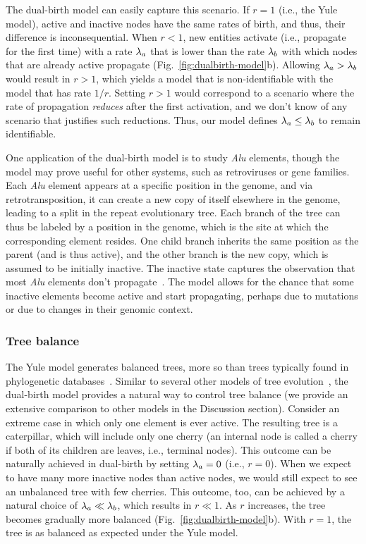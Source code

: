 The dual-birth model can easily capture this scenario. If $r=1$ (i.e., the Yule model), active and inactive nodes have the same rates of birth, and thus, their difference is inconsequential. When $r<1$, new entities activate (i.e., propagate for the first time) with a rate $\lambda_a$ that is lower than the rate $\lambda_b$ with which nodes that are already active propagate (Fig.~\ref{fig:dualbirth-model}b). Allowing $\lambda_a > \lambda_b$ would result in $r > 1$, which yields a model that is non-identifiable with the model that has rate $1/r$. Setting $r>1$ would correspond to a scenario where the rate of propagation \textit{reduces} after the first activation, and we don't know of any scenario that justifies such reductions. Thus, our model defines $\lambda_a\leq\lambda_b$ to remain identifiable.

One application of the dual-birth model is to study \textit{Alu} elements, though the model may prove useful for other systems, such as retroviruses or gene families. Each \textit{Alu} element appears at a specific position in the genome, and via retrotransposition, it can create a new copy of itself elsewhere in the genome, leading to a split in the repeat evolutionary tree. Each branch of the tree can thus be labeled by a position in the genome, which is the site at which the corresponding element resides. One child branch inherits the same position as the parent (and is thus active), and the other branch is the new copy, which is assumed to be initially inactive. The inactive state captures the observation that most \textit{Alu} elements don't propagate~\cite{Batzer2002}. The model allows for the chance that some inactive elements become active and start propagating, perhaps due to mutations or due to changes in their genomic context.

\subsubsection{Tree balance}
The Yule model generates balanced trees, more so than trees typically found in phylogenetic databases~\cite{Guyer1991,Blum2006,Jones2011}. Similar to several other models of tree evolution~\cite{Aldous1996,Blum2006,Maddison2007}, the dual-birth model provides a natural way to control tree balance (we provide an extensive comparison to other models in the Discussion section). Consider an extreme case in which only one element is ever active. The resulting tree is a caterpillar, which will include only one cherry (an internal node is called a cherry if both of its children are leaves, i.e., terminal nodes). This outcome can be naturally achieved in dual-birth by setting $\lambda_a=0$ (i.e., $r=0$). When we expect to have many more inactive nodes than active nodes, we would still expect to see an unbalanced tree with few cherries. This outcome, too, can be achieved by a natural choice of $\lambda_a\ll\lambda_b$, which results in $r\ll 1$. As $r$ increases, the tree becomes gradually more balanced (Fig.~\ref{fig:dualbirth-model}b). With $r=1$, the tree is as balanced as expected under the Yule model.

